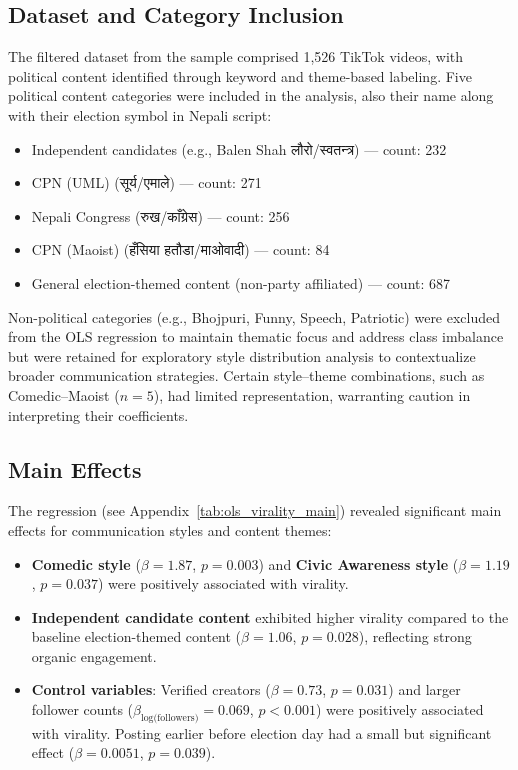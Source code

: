 \documentclass[12pt,a4paper]{report}
\begin{document}
\subsection{Dataset and Category Inclusion}
The filtered dataset from the sample comprised 1,526 TikTok videos, with political content identified through keyword and theme-based labeling. Five political content categories were included in the analysis, also their name along with their election symbol in Nepali script:
\begin{itemize}[noitemsep]
    \item Independent candidates (e.g., Balen Shah \texthindi{लौरो/स्वतन्त्र}) — count: 232
    \item CPN (UML) (\texthindi{सूर्य/एमाले}) — count: 271
    \item Nepali Congress (\texthindi{रुख/काँग्रेस}) — count: 256
    \item CPN (Maoist) (\texthindi{हँसिया हतौडा/माओवादी}) — count: 84
    \item General election-themed content (non-party affiliated) — count: 687
\end{itemize}
\newpage
Non-political categories (e.g., Bhojpuri, Funny, Speech, Patriotic) were excluded from the OLS regression to maintain thematic focus and address class imbalance but were retained for exploratory style distribution analysis to contextualize broader communication strategies. Certain style--theme combinations, such as Comedic--Maoist (\( n = 5 \)), had limited representation, warranting caution in interpreting their coefficients.

\subsection{Main Effects}
The regression (see Appendix~\ref{tab:ols_virality_main}) revealed significant main effects for communication styles and content themes:
\begin{itemize}[noitemsep]
    \item \textbf{Comedic style} (\( \beta = 1.87 \), \( p = 0.003 \)) and \textbf{Civic Awareness style} (\( \beta = 1.19 \), \( p = 0.037 \)) were positively associated with virality.
    \item \textbf{Independent candidate content} exhibited higher virality compared to the baseline election-themed content (\( \beta = 1.06 \), \( p = 0.028 \)), reflecting strong organic engagement.
    \item \textbf{Control variables}: Verified creators (\( \beta = 0.73 \), \( p = 0.031 \)) and larger follower counts (\( \beta_{\text{log(followers)}} = 0.069 \), \( p < 0.001 \)) were positively associated with virality. Posting earlier before election day had a small but significant effect (\( \beta = 0.0051 \), \( p = 0.039 \)).
\end{itemize}
\end{document}

